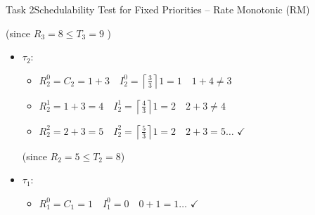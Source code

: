 \begin{frame}[allowframebreaks]{Task 2}{Schedulability Test for Fixed Priorities – Rate Monotonic (RM)}
\begin{solutionnoinc}
\begin{itemize}
\begin{itemize}
        (since $R_3=8 \leq T_3=9$ )
      \end{itemize}
    \end{itemize}
  \end{solutionnoinc}
  \begin{solution}
    \begin{itemize}
      \item $\tau_2$:
        \begin{itemize}
          \item $R_2^0=C_2=1+3 \quad I_2^0=\left\lceil\frac{3}{3}\right\rceil 1=1 \quad 1+4 \neq 3$
          \item $R_2^1=1+3=4 \quad I_2^1=\left\lceil\frac{4}{3}\right\rceil 1=2 \quad 2+3 \neq 4$
          \item $R_2^2=2+3=5 \quad I_2^2=\left\lceil\frac{5}{3}\right\rceil 1=2 \quad 2+3=5 \ldots$ $\checkmark$
        \end{itemize}

          (since $R_2=5 \leq T_2=8$)
      \item $\tau_1$:
        \begin{itemize}
          \item $R_1^0=C_1=1 \quad I_1^0=0 \quad 0+1=1 \ldots$ $\checkmark$
        \end{itemize}


\end{itemize}
\end{solution}
\end{frame}

